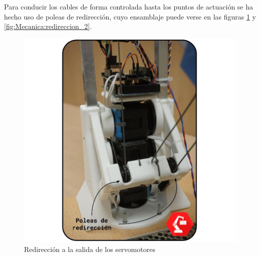     Para conducir los cables de forma controlada hasta los puntos de actuación se ha hecho uso de poleas de redirección, cuyo ensamblaje puede verse en las figuras \ref{fig:Mecanica:redireccion_1} y \ref{fig:Mecanica:redireccion_2}.

    \begin{minipage}{0.47\textwidth}
        \begin{figure}[H]
            \centering
            \includegraphics[width=1.15\textwidth]{figuras/Imagenes_Mecanica/foto_brazo_6.jpg}
            \caption{Redirección a la salida de los servomotores}
            \label{fig:Mecanica:redireccion_1}
        \end{figure}
    \end{minipage}
